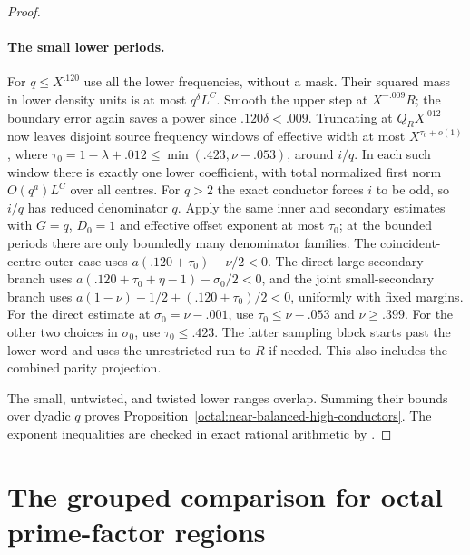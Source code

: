 \documentclass[11pt,a4paper]{article}
\theoremstyle{paperplain}
\numberwithin{equation}{section}
\begin{document}
\begin{proof}
\paragraph{The small lower periods.}
For $q\le X^{.120}$ use all the lower frequencies, without
a mask. Their squared mass in lower density units is at most
$q^\delta L^C$. Smooth the upper step at $X^{-.009}R$;
the boundary error again saves a power since $.120\delta<.009$.
Truncating at $Q_R X^{.012}$ now leaves disjoint source
frequency windows of effective width at most $X^{\tau_0+o(1)}$,
where $\tau_0=1-\lambda+.012\le\min(.423,\nu-.053)$,
around $i/q$. In each such window there is exactly one
lower coefficient, with total normalized first norm
$O(q^a)L^C$ over all centres. For $q>2$ the exact conductor forces $i$ to be odd,
so $i/q$ has reduced denominator $q$. Apply the same inner and
secondary estimates with $G=q$, $D_0=1$ and effective
offset exponent at most $\tau_0$; at the bounded periods
there are only boundedly many denominator families.
The coincident-centre outer case uses
$a(.120+\tau_0)-\nu/2<0$. The direct large-secondary branch uses
$a(.120+\tau_0+\eta-1)-\sigma_0/2<0$, and the joint
small-secondary branch uses
$a(1-\nu)-1/2+(.120+\tau_0)/2<0$, uniformly with fixed
margins. For the direct estimate at $\sigma_0=\nu-.001$,
use $\tau_0\le\nu-.053$ and $\nu\ge.399$. For the other
two choices in $\sigma_0$, use $\tau_0\le .423$.
The latter sampling block starts past the lower
word and uses the unrestricted run to $R$ if needed.
This also includes the combined parity projection.

The small, untwisted, and twisted lower ranges overlap.
Summing their bounds over dyadic $q$ proves Proposition~\ref{octal:near-balanced-high-conductors}.
The exponent inequalities are checked in exact rational arithmetic by
.
\end{proof}



\section{The grouped comparison for octal prime-factor regions}
\label{sec:octal-balanced-proof}
\end{document}
